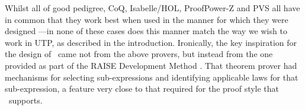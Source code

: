 Whilst all of good pedigree, CoQ, Isabelle/HOL, ProofPower-Z and PVS
all have in common that they work best when used in the manner
for which they were designed%
---in none of these cases does this manner match the way
we wish to work in UTP, as described in the introduction.
Ironically, the key inspiration for the design of \STHN\ came not from the
above provers, but instead from the one provided as part
of the RAISE Development Method \cite{bk:Raise-dev-mthd:95}.
That theorem prover had mechanisms for selecting sub-expressions
and identifying applicable laws for that sub-expression,
a feature very close to that required for the proof style that \STHN\ supports.
